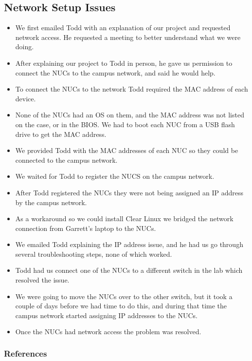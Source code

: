 \documentclass[pdf]{beamer}
\begin{document}
\begin{frame}[allowframebreaks]
	\section{Network Setup Issues}
	\begin{itemize}
		\item We first emailed Todd with an explanation of our project and 
			requested network access. He requested a meeting to better 
			understand what we were doing.
		\item After explaining our project to Todd in person, he gave us 
			permission to connect the NUCs to the campus network, and said he 
			would help.
		\item To connect the NUCs to the network Todd required the MAC address 
			of each device.
		\item None of the NUCs had an OS on them, and the MAC address was not 
			listed on the case, or in the BIOS.
			We had to boot each NUC from a USB flash drive to get the MAC 
			address.
		\item We provided Todd with the MAC addresses of each NUC so they could 
			be connected to the campus network.
		\item We waited for Todd to register the NUCS on the campus network.
		\item After Todd registered the NUCs they were not being assigned an IP 
			address by the campus network.
		\item As a workaround so we could install Clear Linux we bridged the 
			network connection from Garrett's laptop to the NUCs.
		\item We emailed Todd explaining the IP address issue, and he had us go
			through several troubleshooting steps, none of which worked.
		\item Todd had us connect one of the NUCs to a different switch in the 
			lab which resolved the issue.
		\item We were going to move the NUCs over to the other switch, but it 
			took a couple of days before we had time to do this, and during 
			that time the campus network started assigning IP addresses to the 
			NUCs.
		\item Once the NUCs had network access the problem was resolved.
	\end{itemize}

\end{frame}

\begin{frame}
\end{frame}
\begin{frame}
	\frametitle{References}
		
		
	\end{frame}
\end{document}
